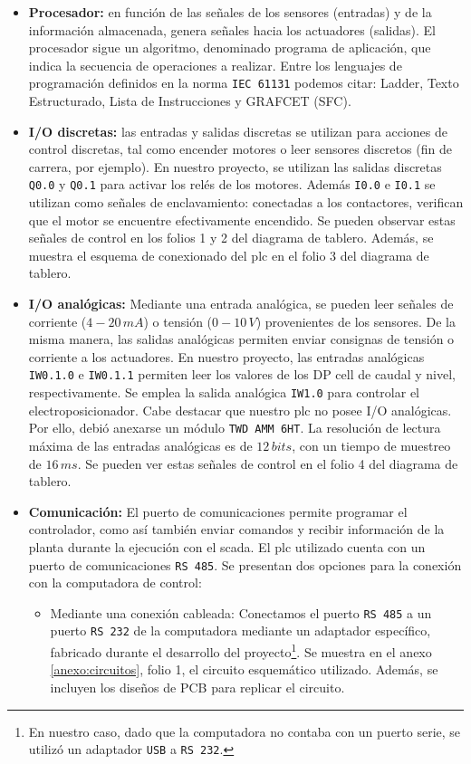 \begin{itemize}
 \item \textbf{Procesador:} en función de las señales de los sensores
(entradas) y de la información almacenada, genera señales hacia los actuadores
(salidas).
El procesador sigue un algoritmo, denominado programa de aplicación,
que indica la secuencia de operaciones a realizar.
Entre los lenguajes de programación definidos en la norma \verb|IEC 61131|
podemos citar: Ladder, Texto Estructurado, Lista de Instrucciones y GRAFCET
(SFC).
 \item \textbf{I/O discretas:} las entradas y salidas discretas se
utilizan para acciones de control discretas, tal como encender motores
o leer sensores discretos (fin de carrera, por ejemplo).
En nuestro proyecto, se utilizan las salidas discretas \verb|Q0.0| y \verb|Q0.1|
para activar los relés de los motores.
Además \verb|I0.0| e \verb|I0.1| se
utilizan como señales de enclavamiento: conectadas a los contactores, verifican
que el motor se encuentre efectivamente encendido.
Se pueden observar estas señales de control en los folios 1 y 2 del diagrama de
tablero.
Además, se muestra el esquema de conexionado del \gls{plc} en el folio
3 del diagrama de tablero.
\item \textbf{I/O analógicas:}  Mediante una entrada
analógica, se pueden leer
señales de corriente ($4-20\,mA$) o tensión ($0-10\,V$) provenientes de los
sensores.
De la misma manera, las salidas analógicas permiten enviar consignas
de tensión o corriente a los actuadores.
En nuestro proyecto, las entradas analógicas \verb|IW0.1.0| e \verb|IW0.1.1|
permiten leer los valores de los DP cell de caudal y nivel, respectivamente.
Se emplea la salida analógica \verb|IW1.0| para controlar el
electroposicionador.
Cabe destacar que nuestro \gls{plc} no posee I/O analógicas.
Por ello, debió anexarse un módulo \verb|TWD AMM 6HT|.
La resolución de lectura máxima de las entradas analógicas es de $12\,bits$,
con un tiempo de muestreo de $16\,ms$.
Se pueden ver estas señales de control en el folio 4 del diagrama de tablero.

\item \textbf{Comunicación:} El puerto de comunicaciones permite programar el 
controlador, como así también enviar comandos y recibir información de
la planta durante la ejecución con el \gls{scada}.
El \gls{plc} utilizado cuenta con un puerto de comunicaciones \verb|RS 485|.
Se presentan dos opciones para la conexión con la computadora de control:
\begin{itemize}
 \item Mediante una conexión cableada:
 Conectamos el puerto \verb|RS 485| a un puerto \verb|RS 232| de la computadora
mediante un adaptador específico, fabricado durante el desarrollo del
proyecto\footnote{En nuestro caso, dado que la computadora no contaba con un
puerto serie, se utilizó un adaptador
\texttt{USB} a \texttt{RS 232}.}.
Se muestra en el anexo \ref{anexo:circuitos}, folio 1, el circuito esquemático
utilizado.
Además, se incluyen los diseños de PCB para replicar el circuito.


\end{itemize}
\end{itemize}
